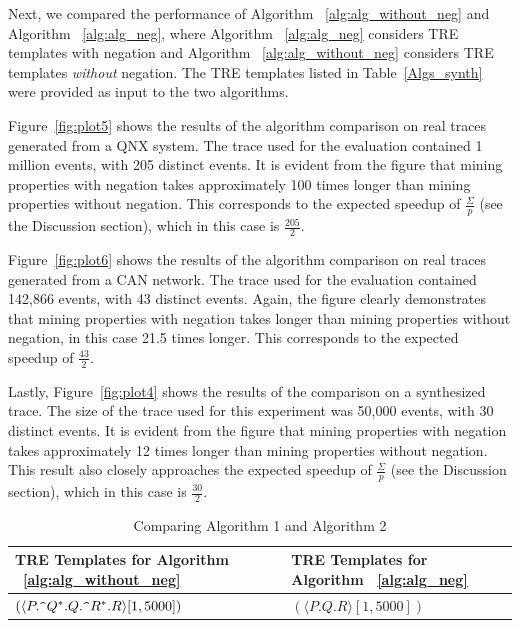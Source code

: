 \documentclass[]{sigplanconf}
\begin{document}
Next, we compared the performance of Algorithm ~\ref{alg:alg_without_neg} and Algorithm ~\ref{alg:alg_neg}, where Algorithm ~\ref{alg:alg_neg} considers TRE templates with negation and Algorithm ~\ref{alg:alg_without_neg} considers TRE templates \emph{without} negation. The TRE templates listed in Table~\ref{Algs_synth} were provided as input to the two algorithms.

Figure~\ref{fig:plot5} shows the results of the algorithm comparison on real traces generated from a QNX system. The trace used for the evaluation contained 1 million events, with 205 distinct events. It is evident from the figure that mining properties with negation takes approximately 100 times longer than mining properties without negation. This corresponds to the expected speedup of $\frac{\Sigma}{p}$ (see the Discussion section), which in this case is $\frac{205}{2}$.

Figure~\ref{fig:plot6} shows the results of the algorithm comparison on real traces generated from a CAN network. The trace used for the evaluation contained 142,866 events, with 43 distinct events. Again, the figure clearly demonstrates that mining properties with negation takes longer than mining properties without negation, in this case 21.5 times longer. This corresponds to the expected speedup of $\frac{43}{2}$.

Lastly, Figure~\ref{fig:plot4} shows the results of the comparison on a synthesized trace. The size of the trace used for this experiment was 50,000 events, with 30 distinct events. It is evident from the figure that mining properties with negation takes approximately 12 times longer than mining properties without negation. This result also closely approaches the expected speedup of $\frac{\Sigma}{p}$ (see the Discussion section), which in this case is $\frac{30}{2}$.




\begin{table}[ht]
	\centering
	\begin{tabular}{|l|l|}
		\hline
		\textbf{TRE Templates for Algorithm ~\ref{alg:alg_without_neg}} & \textbf{TRE Templates for Algorithm ~\ref{alg:alg_neg}} \\
		\hline
		 $(\langle P.\verb!^!Q^*.Q.\verb!^!R^*.R \rangle [1, 5000])$& $(\langle P.Q.R \rangle [1, 5000])$ \\
	\end{tabular}

	\caption{Comparing Algorithm 1 and Algorithm 2}
	\label{miningOverhead}
\end{table}
\end{document}
